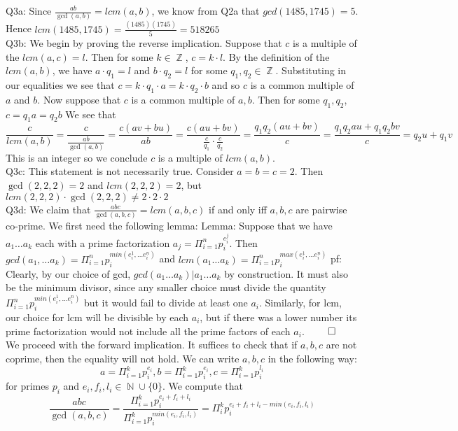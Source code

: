\documentclass[letterpaper]{article}
\DeclareMathOperator{\N}{\mathbb{N}}
\DeclareMathOperator{\Z}{\mathbb{Z}}
\begin{document}
\noindent 
Q3a: Since $\frac{ab}{\gcd(a,b)}=lcm(a,b)$, we know from Q2a that $gcd(1485,1745)=5$. Hence $lcm(1485,1745) = \frac{(1485)(1745)}{5} = 518265$
\newline \\ Q3b: We begin by proving the reverse implication. Suppose that $c$ is a multiple of the $lcm(a,c)=l$. Then for some $k\in \Z$, $c = k\cdot l$. By the definition of the $lcm(a,b)$, we have $a\cdot q_1 = l$ and $b\cdot q_2 = l$ for some $q_1,q_2\in \Z$. Substituting in our equalities we see that $c = k \cdot q_1 \cdot a = k\cdot q_2 \cdot b$ and so $c$ is a common multiple of $a$ and $b$. 
Now suppose that $c$ is a common multiple of $a,b$. Then for some $q_1,q_2$, $c=q_1 a = q_2 b$ We see that $$ \frac{c}{lcm(a,b)} = \frac{c}{\frac{ab}{\gcd(a,b)}} = \frac{c(av+bu)}{ab} = \frac{c(au+bv)}{\frac{c}{q_1}\cdot \frac{c}{q_2}} = \frac{q_1q_2(au+bv)}{c} = \frac{q_1q_2 a u+ q_1q_2bv}{c} = q_2u+q_1v$$
This is an integer so we conclude $c$ is a multiple of $lcm(a,b)$. 
\newline \\ Q3c: This statement is not necessarily true. Consider $a=b=c=2$. Then $\gcd(2,2,2)=2$ and $lcm(2,2,2)=2$, but $lcm(2,2,2)\cdot \gcd(2,2,2) \neq 2\cdot 2\cdot 2$
\newline \\ Q3d: We claim that $\frac{abc}{\gcd(a,b,c)} = lcm(a,b,c)$ if and only iff $a,b,c$ are pairwise co-prime. 
We first need the following lemma: 
\newline Lemma: Suppose that we have $a_1\dots a_k$ each with a prime factorization $a_j = \Pi_{i=1}^n p_i^{e^j_i}$. Then $gcd(a_1,\dots a_k) = \Pi_{i=1}^n p_i^{min(e^1_i,\dots e^n_i)}$ and $lcm(a_1\dots a_k) = \Pi_{i=1}^n p_i^{max(e^1_i,\dots e^n_i)}$
\newline pf: Clearly, by our choice of gcd, $gcd(a_1\dots a_k)|a_1\dots a_k$ by construction. It must also be the minimum divisor, since any smaller choice must divide the quantity $\Pi_{i=1}^n p_i^{min(e^1_i,\dots e^n_i)}$ but it would fail to divide at least one $a_i$. Similarly, for lcm, our choice for lcm will be divisible by each $a_i$, but if there was a lower number its prime factorization would not include all the prime factors of each $a_i$. $\qed$
\newline \\ We proceed with the forward implication. 
It suffices to check that if $a,b,c$ are not coprime, then the equality will not hold. We can write $a,b,c$ in the following way: $$a=\Pi_{i=1}^k p_i^{e_i}, b=\Pi_{i=1}^k p_i^{e_i}, c=\Pi_{i=1}^k p_i^{l_i}$$ for primes $p_i$ and $e_i,f_i,l_i\in \N \cup \{0\}$. We compute that $$\frac{abc}{\gcd(a,b,c)} = \frac{\Pi_{i=1}^k p_i^{e_i+f_i+l_i}}{\Pi_{i=1}^k p_i^{min(e_i,f_i,l_i)}} = \Pi_i^{k} p_i^{e_i+f_i+l_i-min(e_i,f_i,l_i)}$$
\end{document}
